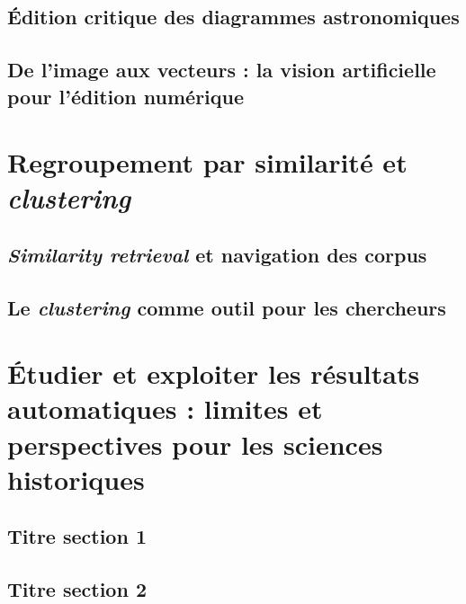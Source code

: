 \documentclass[a4paper,12pt,twoside]{book}
\newcommand{\clearemptydoublepage}{\newpage{\pagestyle{empty}\cleardoublepage}}
\begin{document}
                \section{Édition critique des diagrammes astronomiques}
                    
            
                \section{De l’image aux vecteurs : la vision artificielle pour l’édition numérique}
                    
            
        \clearemptydoublepage
        
        \chapter{Regroupement par similarité et \textit{clustering}}
                \section{\textit{Similarity retrieval} et navigation des corpus}
                    
            
                \section{Le \textit{clustering} comme outil pour les chercheurs}
                    
            
        \clearemptydoublepage
        
        \chapter{Étudier et exploiter les résultats automatiques : limites et perspectives pour les sciences historiques}
                \section{Titre section 1}
                    
            
                \section{Titre section 2}
                    
            
\end{document}
